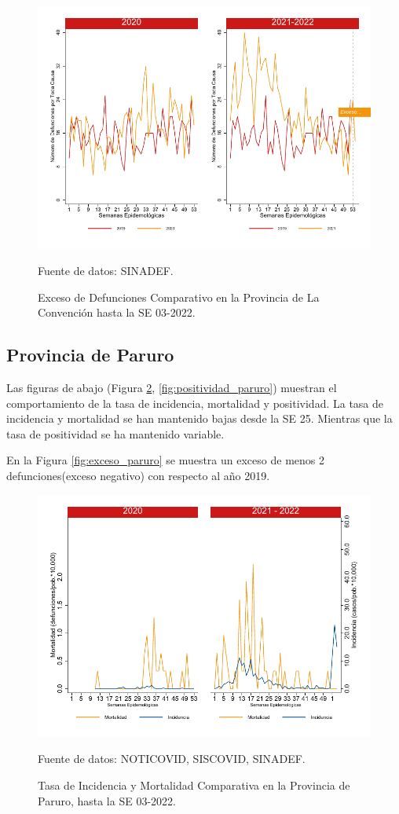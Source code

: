 \documentclass[12pt,a4paper,openany]{book}
\begin{document}
		\begin{figure}[h]
			\caption{Exceso de Defunciones Comparativo en la Provincia de La Convención hasta la SE 03-2022.}\label{fig:exceso_laconv}
			\begin{center}
				\includegraphics[width=0.7\linewidth]{../figuras/exceso_9}
			\end{center}
			{\footnotesize {Fuente de datos: SINADEF.}}
		\end{figure}
		
		\clearpage
		
		\subsection*{Provincia de Paruro}
		\noindent Las figuras de abajo (Figura \ref{fig:inc_mort_paruro}, \ref{fig:positividad_paruro}) muestran el comportamiento de la tasa de incidencia, mortalidad y positividad. La tasa de incidencia y mortalidad se han mantenido bajas desde la SE 25.  Mientras que la tasa de positividad se ha mantenido variable.
	 
	 En la Figura \ref{fig:exceso_paruro} se muestra un exceso de menos 2 defunciones(exceso negativo) con respecto al año 2019.
		
		\begin{figure}[h]
			\caption{Tasa de Incidencia y Mortalidad Comparativa en la Provincia de Paruro, hasta la SE 03-2022.}\label{fig:inc_mort_paruro}
			\begin{center}
				\includegraphics[width=0.7\linewidth]{../figuras/incidencia_mortalidad_20_21_10}
			\end{center}
			{\footnotesize {Fuente de datos: NOTICOVID, SISCOVID, SINADEF.}} 
		\end{figure}
		
\end{document}
